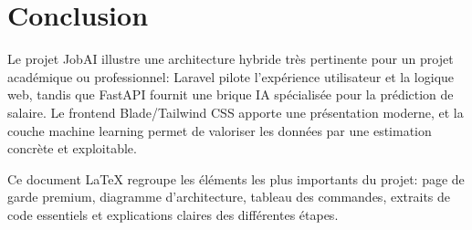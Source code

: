 \documentclass[11pt,a4paper]{article}
\begin{document}
\section{Conclusion}
Le projet JobAI illustre une architecture hybride tr\`es pertinente pour un projet acad\'emique ou professionnel: Laravel pilote l'exp\'erience utilisateur et la logique web, tandis que FastAPI fournit une brique IA sp\'ecialis\'ee pour la pr\'ediction de salaire. Le frontend Blade/Tailwind CSS apporte une pr\'esentation moderne, et la couche machine learning permet de valoriser les donn\'ees par une estimation concr\`ete et exploitable.

Ce document LaTeX regroupe les \'el\'ements les plus importants du projet: page de garde premium, diagramme d'architecture, tableau des commandes, extraits de code essentiels et explications claires des diff\'erentes \'etapes.
\end{document}
